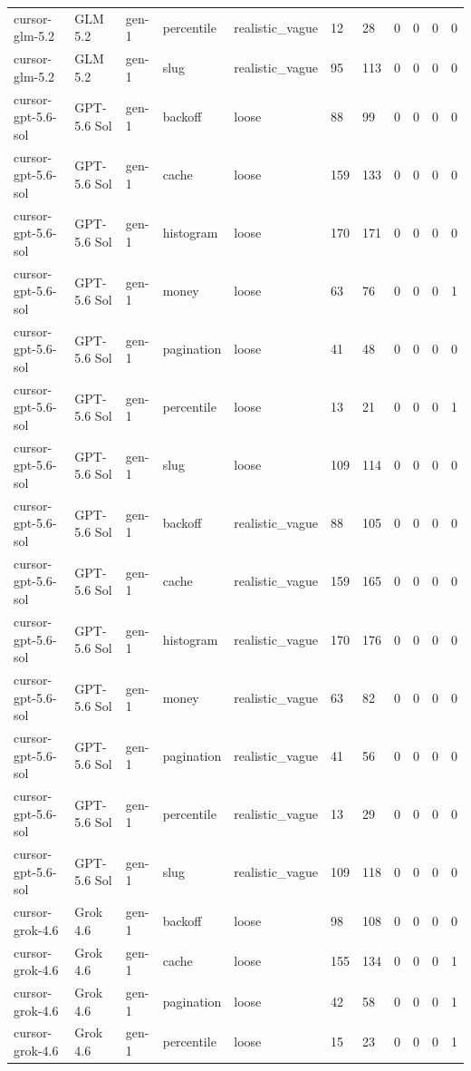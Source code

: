 \begin{tabular}{lllllllllll}
cursor-glm-5.2 & GLM 5.2 & gen-1 & percentile & realistic\_vague & 12 & 28 & 0 & 0 & 0 & 0 \\
cursor-glm-5.2 & GLM 5.2 & gen-1 & slug & realistic\_vague & 95 & 113 & 0 & 0 & 0 & 0 \\
cursor-gpt-5.6-sol & GPT-5.6 Sol & gen-1 & backoff & loose & 88 & 99 & 0 & 0 & 0 & 0 \\
cursor-gpt-5.6-sol & GPT-5.6 Sol & gen-1 & cache & loose & 159 & 133 & 0 & 0 & 0 & 0 \\
cursor-gpt-5.6-sol & GPT-5.6 Sol & gen-1 & histogram & loose & 170 & 171 & 0 & 0 & 0 & 0 \\
cursor-gpt-5.6-sol & GPT-5.6 Sol & gen-1 & money & loose & 63 & 76 & 0 & 0 & 0 & 1 \\
cursor-gpt-5.6-sol & GPT-5.6 Sol & gen-1 & pagination & loose & 41 & 48 & 0 & 0 & 0 & 0 \\
cursor-gpt-5.6-sol & GPT-5.6 Sol & gen-1 & percentile & loose & 13 & 21 & 0 & 0 & 0 & 1 \\
cursor-gpt-5.6-sol & GPT-5.6 Sol & gen-1 & slug & loose & 109 & 114 & 0 & 0 & 0 & 0 \\
cursor-gpt-5.6-sol & GPT-5.6 Sol & gen-1 & backoff & realistic\_vague & 88 & 105 & 0 & 0 & 0 & 0 \\
cursor-gpt-5.6-sol & GPT-5.6 Sol & gen-1 & cache & realistic\_vague & 159 & 165 & 0 & 0 & 0 & 0 \\
cursor-gpt-5.6-sol & GPT-5.6 Sol & gen-1 & histogram & realistic\_vague & 170 & 176 & 0 & 0 & 0 & 0 \\
cursor-gpt-5.6-sol & GPT-5.6 Sol & gen-1 & money & realistic\_vague & 63 & 82 & 0 & 0 & 0 & 0 \\
cursor-gpt-5.6-sol & GPT-5.6 Sol & gen-1 & pagination & realistic\_vague & 41 & 56 & 0 & 0 & 0 & 0 \\
cursor-gpt-5.6-sol & GPT-5.6 Sol & gen-1 & percentile & realistic\_vague & 13 & 29 & 0 & 0 & 0 & 0 \\
cursor-gpt-5.6-sol & GPT-5.6 Sol & gen-1 & slug & realistic\_vague & 109 & 118 & 0 & 0 & 0 & 0 \\
cursor-grok-4.6 & Grok 4.6 & gen-1 & backoff & loose & 98 & 108 & 0 & 0 & 0 & 0 \\
cursor-grok-4.6 & Grok 4.6 & gen-1 & cache & loose & 155 & 134 & 0 & 0 & 0 & 1 \\
cursor-grok-4.6 & Grok 4.6 & gen-1 & pagination & loose & 42 & 58 & 0 & 0 & 0 & 1 \\
cursor-grok-4.6 & Grok 4.6 & gen-1 & percentile & loose & 15 & 23 & 0 & 0 & 0 & 1 \\

\end{tabular}
